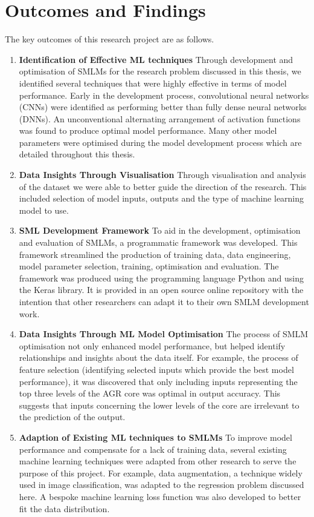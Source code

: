 \section{Outcomes and Findings}

The key outcomes of this research project are as follows.

\begin{enumerate}
	\item \textbf{Identification of Effective ML techniques}
	Through development and optimisation of SMLMs for the research problem discussed in this thesis, we identified several techniques that were  highly effective in terms of model performance. Early in the development process, convolutional neural networks (CNNs) were identified as performing better than fully dense neural networks (DNNs). An unconventional alternating arrangement of activation functions was found to produce optimal model performance. Many other model parameters were optimised during the model development process which are detailed throughout this thesis.
	
	
	\item \textbf{Data Insights Through Visualisation} Through visualisation and analysis of the dataset we were able to better guide the direction of the research. This included selection of model inputs, outputs and the type of machine learning model to use.
	
	
	\item \textbf{SML Development Framework}  To aid in the development, optimisation and evaluation of SMLMs, a programmatic framework was developed. This framework streamlined the production of training data, data engineering, model parameter selection, training, optimisation and evaluation. The framework was produced using the programming language Python and using the Keras library. It is provided in an open source online repository with the intention that other researchers can adapt it to their own SMLM development work.
	 
	\item \textbf{Data Insights Through ML Model Optimisation}
	The process of SMLM optimisation not only enhanced model performance, but helped identify relationships and insights about the data itself. For example, the process of feature selection (identifying selected inputs which provide the best model performance), it was discovered that only including inputs representing the top three levels of the AGR core was optimal in output accuracy. This suggests that inputs concerning the lower levels of the core are irrelevant to the prediction of the output.  
	
	\item \textbf{Adaption of Existing ML techniques to SMLMs}
	To improve model performance and compensate for a lack of training data, several existing machine learning techniques were adapted from other research to serve the purpose of this project. For example, data augmentation, a technique widely used in image classification, was adapted to the regression problem discussed here. A bespoke machine learning loss function was also developed to better fit the data distribution. 
	
	
\end{enumerate}

